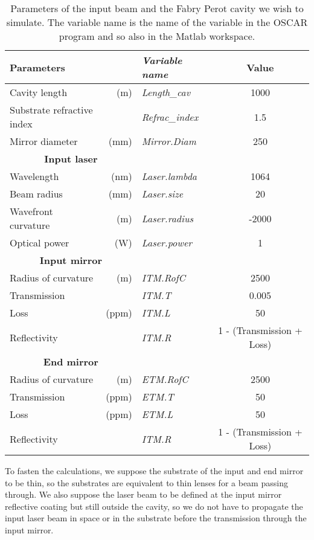 \begin{table}[tbp]
  \centering
  \caption{\label{tab2:param} Parameters of the input beam and the Fabry Perot cavity we wish to simulate. The variable name is the name of the variable in the OSCAR program and so also in the Matlab workspace.}
\begin{tabular}{|l r|>{\slshape}l|c|}
  \hline
  {\large\strut} Parameters & & Variable name & Value \\
  \hline
  {\large\strut} Cavity length &(m) & Length\_cav & 1000 \\
  {\large\strut} Substrate refractive index & & Refrac\_index & 1.5 \\
  {\large\strut} Mirror diameter &(mm) & Mirror.Diam & 250 \\
  \hline
  \hline
  \multicolumn{2}{|c|}{{\large\strut} \textbf{Input laser}} \\
  \hline
  {\large\strut} Wavelength &(nm) & Laser.lambda & 1064 \\
  {\large\strut} Beam radius &(mm) & Laser.size & 20 \\
  {\large\strut} Wavefront curvature &(m) & Laser.radius & -2000 \\
  {\large\strut} Optical power &(W) & Laser.power & 1 \\
  \hline
  \hline
  \multicolumn{2}{|c|}{{\large\strut} \textbf{Input mirror}} \\
  \hline
  {\large\strut} Radius of curvature &(m) & ITM.RofC & 2500 \\
  {\large\strut} Transmission & & ITM.T & 0.005 \\
  {\large\strut} Loss &(ppm) & ITM.L & 50 \\
  {\large\strut} Reflectivity & & ITM.R & 1 - (Transmission + Loss) \\
  \hline
  \hline
  \multicolumn{2}{|c|}{{\large\strut} \textbf{End mirror}} \\
  \hline
  {\large\strut} Radius of curvature &(m) & ETM.RofC & 2500 \\
  {\large\strut} Transmission &(ppm) & ETM.T & 50 \\
  {\large\strut} Loss &(ppm) & ETM.L & 50 \\
  {\large\strut} Reflectivity & & ITM.R & 1 - (Transmission + Loss) \\
  \hline
\end{tabular}
\end{table}

To fasten the calculations, we suppose the substrate of the input and end mirror to be thin, so the substrates are equivalent to thin lenses for a beam passing through. We also suppose the laser beam to be defined at the input mirror reflective coating but still outside the cavity, so we do not have to propagate the input laser beam in space or in the substrate before the transmission through the input mirror.

